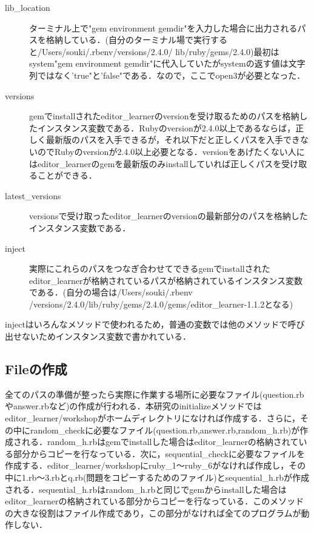\begin{description}
\def\labelenumi{\arabic{enumi}.}
\tightlist
\item[lib\_location]
ターミナル上で"gem environment gemdir"を入力した場合に出力されるパスを格納している．(自分のターミナル場で実行すると/Users/souki/.rbenv/versions/2.4.0/
  lib/ruby/gems/2.4.0)最初はsystem"gem environment gemdir"に代入していたがsystemの返す値は文字列ではなく'true"と'false"である．なので，ここでopen3が必要となった．
\item[versions]
 gemでinstallされたeditor\_learnerのversionを受け取るためのパスを格納したインスタンス変数である．Rubyのversionが2.4.0以上であるならば，正しく最新版のパスを入手できるが，それ以下だと正しくパスを入手できないのでRubyのversionが2.4.0以上必要となる．versionをあげたくない人にはeditor\_learnerのgemを最新版のみinstallしていれば正しくパスを受け取ることができる．
\item[latest\_versions]
 versionsで受け取ったeditor\_learnerのversionの最新部分のパスを格納したインスタンス変数である．
\item[inject]
実際にこれらのパスをつなぎ合わせてできるgemでinstallされたeditor\_learnerが格納されているパスが格納されているインスタンス変数である．(自分の場合は/Users/souki/.rbenv
  /versions/2.4.0/lib/ruby/gems/2.4.0/gems/editor\_learner-1.1.2となる)
\end{description}
injectはいろんなメソッドで使われるため，普通の変数では他のメソッドで呼び出せないためインスタンス変数で書かれている．

\subsection{Fileの作成}\label{fileux306eux4f5cux6210}

全てのパスの準備が整ったら実際に作業する場所に必要なファイル(question.rbやanswer.rbなど)の作成が行われる．本研究のinitializeメソッドではeditor\_learner/workshopがホームディレクトリになければ作成する．さらに，その中にrandom\_checkに必要なファイル(question.rb,answer.rb,random\_h.rb)が作成される．random\_h.rbはgemでinstallした場合はeditor\_learnerの格納されている部分からコピーを行なっている．次に，sequential\_checkに必要なファイルを作成する．editor\_learner/workshopにruby\_1〜ruby\_6がなければ作成し，その中に1.rb〜3.rbとq.rb(問題をコピーするためのファイル)とsequential\_h.rbが作成される．sequential\_h.rbはrandom\_h.rbと同じでgemからinstallした場合はeditor\_learnerの格納されている部分からコピーを行なっている．このメソッドの大きな役割はファイル作成であり，この部分がなければ全てのプログラムが動作しない．

